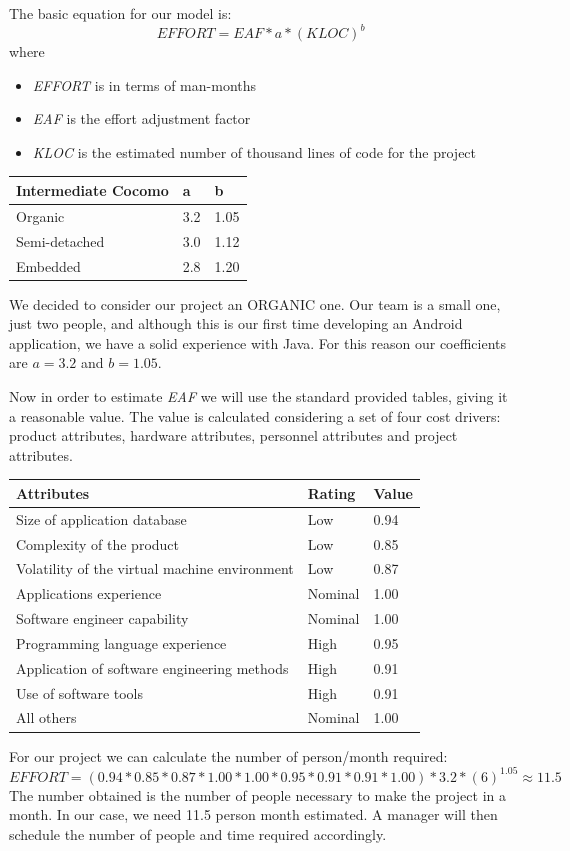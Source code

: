 \documentclass[a4paper]{scrreprt}
\begin{document}
The basic equation for our model is:
\[ EFFORT = EAF * a * (KLOC)^b  \]
where
\begin{itemize}
	\item \emph{EFFORT} is in terms of man-months
	\item \emph{EAF} is the effort adjustment factor
	\item \emph{KLOC} is the estimated number of thousand lines of code for the project
\end{itemize}

\bigskip
\noindent
\begin{tabularx}{\linewidth}{|X|l|l|}
	\hline
	\textbf{Intermediate Cocomo}	&\textbf{a}	&\textbf{b} \\ \hline
	Organic & 3.2 & 1.05 \\ \hline
	Semi-detached & 3.0 & 1.12 \\ \hline
	Embedded & 2.8 & 1.20 \\ \hline
\end{tabularx}
\bigskip

We decided to consider our project an ORGANIC one. Our team is a small one, just two people, and although this is our first time developing an Android application, we have a solid experience with Java. For this reason our coefficients are $ a = 3.2 $ and $ b = 1.05 $.

Now in order to estimate \emph{EAF} we will use the standard provided tables, giving it a reasonable value. The value is calculated considering a set of four cost drivers: product attributes, hardware attributes, personnel attributes and project attributes.

\bigskip
\noindent
\begin{tabularx}{\linewidth}{|X|l|l|}
	\hline
	\textbf{Attributes} & \textbf{Rating} & \textbf{Value} \\ \hline
	Size of application database & Low & 0.94 \\ \hline
	Complexity of the product & Low & 0.85 \\ \hline
	Volatility of the virtual machine environment & Low & 0.87 \\ \hline
	Applications experience & Nominal & 1.00 \\ \hline
	Software engineer capability & Nominal & 1.00 \\ \hline
	Programming language experience & High & 0.95 \\ \hline
	Application of software engineering methods & High & 0.91 \\ \hline
	Use of software tools & High & 0.91 \\ \hline
	All others & Nominal & 1.00 \\ \hline
\end{tabularx}
\bigskip
For our project we can calculate the number of person/month required:
\[ EFFORT = (0.94*0.85*0.87*1.00*1.00*0.95*0.91*0.91*1.00)*3.2*(6)^{1.05} \approx 11.5 \]
The number obtained is the number of people necessary to make the project in a month. In our case, we need 11.5 person month estimated. A manager will then schedule the number of people and time required accordingly.
\end{document}

